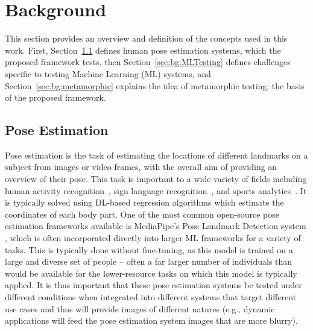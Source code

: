 \section{Background}
\label{sec:background}

This section provides an overview and definition of the concepts used in this work. First, Section~\ref{sec:bg:pose} defines human pose estimation systems, which the proposed framework tests, then Section~\ref{sec:bg:MLTesting} defines challenges specific to testing Machine Learning (ML) systems, and Section~\ref{sec:bg:metamorphic} explains the idea of metamorphic testing, the basis of the proposed framework. 

\subsection{Pose Estimation}
\label{sec:bg:pose}

Pose estimation is the task of estimating the locations of different landmarks on a subject from images or video frames, with the overall aim of providing an overview of their pose. This task is important to a wide variety of fields including human activity recognition~\cite{luvizon20182d}, sign language recognition~\cite{holmes2023scarcity}, and sports analytics~\cite{martin2021automated}. It is typically solved using DL-based regression algorithms which estimate the coordinates of each body part. One of the most common open-source pose estimation frameworks available is MediaPipe's Pose Landmark Detection system \cite{mediapipePose}, which is often incorporated directly into larger ML frameworks for a variety of tasks. This is typically done without fine-tuning, as this model is trained on a large and diverse set of people -- often a far larger number of individuals than would be available for the lower-resource tasks on which this model is typically applied. It is thus important that these pose estimation systems be tested under different conditions when integrated into different systems that target different use cases and thus will provide images of different natures (e.g., dynamic applications will feed the pose estimation system images that are more blurry).


